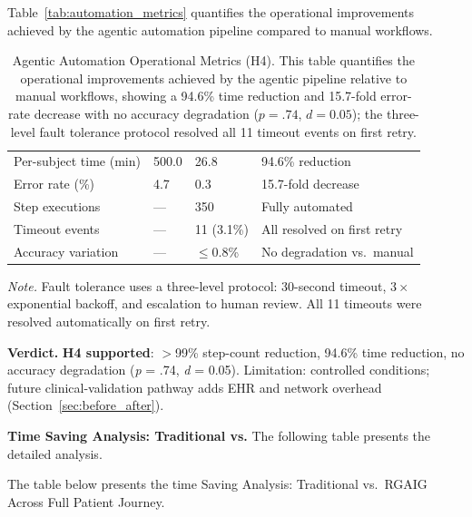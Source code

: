 Table~\ref{tab:automation_metrics} quantifies the operational improvements achieved by the agentic automation pipeline compared to manual workflows.

\begin{table}[!htbp]
\tablestripes\tablefontsize
\caption[Agentic Automation Operational Metrics (H4)]{Agentic Automation Operational Metrics (H4). This table quantifies the operational improvements achieved by the agentic pipeline relative to manual workflows, showing a 94.6\% time reduction and 15.7-fold error-rate decrease with no accuracy degradation ($p = .74$, $d = 0.05$); the three-level fault tolerance protocol resolved all 11 timeout events on first retry.}
\tablefontsize
\begin{tabularx}{\textwidth}{@{} >{\raggedright\arraybackslash}p{3.5cm} L L L @{}}
\toprule
{} &  &  &  \\
\midrule
Per-subject time (min) & 500.0 & 26.8 & 94.6\% reduction \\
Error rate (\%) & 4.7 & 0.3 & 15.7-fold decrease \\
Step executions & --- & 350 & Fully automated \\
Timeout events & --- & 11 (3.1\%) & All resolved on first retry \\
Accuracy variation & --- & $\leq$0.8\% & No degradation vs.\ manual \\
\bottomrule
\end{tabularx}
\vspace{0.5em}\noindent\textit{Note.} Fault tolerance uses a three-level protocol: 30-second timeout, $3\times$ exponential backoff, and escalation to human review. All 11 timeouts were resolved automatically on first retry.
\end{table}

\textbf{Verdict.} \textbf{H4 supported}: $>$99\% step-count reduction, 94.6\% time reduction, no accuracy degradation (\textit{p} = .74, \textit{d} = 0.05). Limitation: controlled conditions; future clinical-validation pathway adds EHR and network overhead (Section~\ref{sec:before_after}).


\noindent\textbf{Time Saving Analysis: Traditional vs.} The following table presents the detailed analysis.

\noindent The table below presents the time Saving Analysis: Traditional vs.\ RGAIG Across Full Patient Journey.

